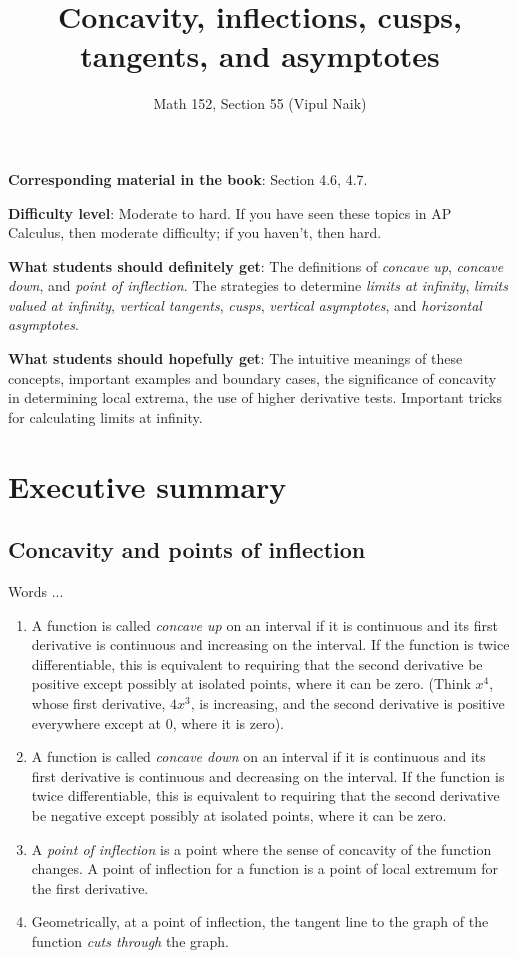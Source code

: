 \documentclass[10pt]{amsart}
\title{Concavity, inflections, cusps, tangents, and asymptotes}
\author{Math 152, Section 55 (Vipul Naik)}
\begin{document}
\maketitle

{\bf Corresponding material in the book}: Section 4.6, 4.7.

{\bf Difficulty level}: Moderate to hard. If you have seen these
topics in AP Calculus, then moderate difficulty; if you haven't, then
hard.

{\bf What students should definitely get}: The definitions of {\em
concave up}, {\em concave down}, and {\em point of inflection}. The
strategies to determine {\em limits at infinity}, {\em limits valued
at infinity}, {\em vertical tangents}, {\em cusps}, {\em vertical
asymptotes}, and {\em horizontal asymptotes}.

{\bf What students should hopefully get}: The intuitive meanings of
these concepts, important examples and boundary cases, the
significance of concavity in determining local extrema, the use of
higher derivative tests. Important tricks for calculating limits at
infinity.

\section*{Executive summary}

\subsection{Concavity and points of inflection}

Words ...

\begin{enumerate}
\item A function is called {\em concave up} on an interval if it is
  continuous and its first derivative is continuous and increasing on
  the interval. If the function is twice differentiable, this is
  equivalent to requiring that the second derivative be positive
  except possibly at isolated points, where it can be zero. (Think
  $x^4$, whose first derivative, $4x^3$, is increasing, and the second
  derivative is positive everywhere except at $0$, where it is zero).
\item A function is called {\em concave down} on an interval if it is
  continuous and its first derivative is continuous and decreasing on
  the interval. If the function is twice differentiable, this is
  equivalent to requiring that the second derivative be negative
  except possibly at isolated points, where it can be zero.
\item A {\em point of inflection} is a point where the sense of
  concavity of the function changes. A point of inflection for a
  function is a point of local extremum for the first derivative.
\item Geometrically, at a point of inflection, the tangent line to the
  graph of the function {\em cuts through} the graph.
\end{enumerate}
\end{document}
